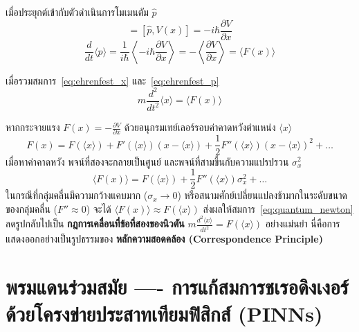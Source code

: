 เมื่อประยุกต์เข้ากับตัวดำเนินการโมเมนตัม $\hat{p}$
\begin{equation}
[\hat{p}, \hat{H}] = [\hat{p}, V(x)] = -i\hbar \frac{\partial V}{\partial x}
\end{equation}
\begin{equation}
\frac{d}{dt}\langle p \rangle = \frac{1}{i\hbar} \left\langle -i\hbar \frac{\partial V}{\partial x} \right\rangle = -\left\langle \frac{\partial V}{\partial x} \right\rangle = \langle F(x) \rangle
\label{eq:ehrenfest_p}
\end{equation}

เมื่อรวมสมการ~\eqref{eq:ehrenfest_x} และ~\eqref{eq:ehrenfest_p}
\begin{equation}
m \frac{d^2}{dt^2}\langle x \rangle = \langle F(x) \rangle
\label{eq:quantum_newton}
\end{equation}

หากกระจายแรง $F(x) = -\frac{\partial V}{\partial x}$ ด้วยอนุกรมเทย์เลอร์รอบค่าคาดหวังตำแหน่ง $\langle x \rangle$
\begin{equation}
F(x) = F(\langle x \rangle) + F'(\langle x \rangle)(x - \langle x \rangle) + \frac{1}{2}F''(\langle x \rangle)(x - \langle x \rangle)^2 + \dots
\end{equation}
เมื่อหาค่าคาดหวัง พจน์ที่สองจะกลายเป็นศูนย์ และพจน์ที่สามขึ้นกับความแปรปรวน $\sigma_x^2$
\begin{equation}
\langle F(x) \rangle = F(\langle x \rangle) + \frac{1}{2} F''(\langle x \rangle) \sigma_x^2 + \dots
\end{equation}
ในกรณีที่กลุ่มคลื่นมีความกว้างแคบมาก ($\sigma_x \to 0$) หรือสนามศักย์เปลี่ยนแปลงช้ามากในระดับขนาดของกลุ่มคลื่น ($F'' \approx 0$) จะได้ $\langle F(x) \rangle \approx F(\langle x \rangle)$ ส่งผลให้สมการ~\eqref{eq:quantum_newton} ลดรูปกลับไปเป็น \textbf{กฎการเคลื่อนที่ข้อที่สองของนิวตัน} $m \frac{d^2 \langle x \rangle}{dt^2} = F(\langle x \rangle)$ อย่างแม่นยำ นี่คือการแสดงออกอย่างเป็นรูปธรรมของ \textbf{หลักความสอดคล้อง (Correspondence Principle)}

\section{พรมแดนร่วมสมัย ---- การแก้สมการชเรอดิงเงอร์ด้วยโครงข่ายประสาทเทียมฟิสิกส์ (PINNs)}

